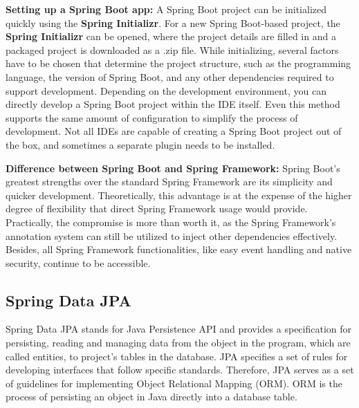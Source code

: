         \blankLine

    \textbf{Setting up a Spring Boot app:} \newline
    A Spring Boot project can be initialized quickly using the \textbf{Spring Initializr}. For a new Spring Boot-based project, the \textbf{Spring Initializr} can be opened, where the project details are filled in and a packaged project is downloaded as a .zip file. While initializing, several factors have to be chosen that determine the project structure, such as the programming language, the version of Spring Boot, and any other dependencies required to support development. \newline
    Depending on the development environment, you can directly develop a Spring Boot project within the IDE itself. Even this method supports the same amount of configuration to simplify the process of development. Not all IDEs are capable of creating a Spring Boot project out of the box, and sometimes a separate plugin needs to be installed.\Autocite{Andi:SpringInit}
    
    \blankLine

    \textbf{Difference between Spring Boot and Spring Framework:} \newline
    Spring Boot's greatest strengths over the standard Spring Framework are its simplicity and quicker development. Theoretically, this advantage is at the expense of the higher degree of flexibility that direct Spring Framework usage would provide. Practically, the compromise is more than  worth it, as the Spring Framework's annotation system can still be utilized to inject other dependencies effectively. Besides, all Spring Framework functionalities, like easy event handling and native security, continue to be accessible. \Autocite{Andi:SpringBoot2}
    
    \subsection{Spring Data JPA}
    Spring Data JPA stands for Java Persistence API and provides a specification for persisting, reading and managing data from the object in the program, which are called entities, to project's tables in the database. JPA specifies a set of rules for developing interfaces that follow specific standards. Therefore, JPA serves as a set of guidelines for implementing Object Relational Mapping (ORM). 
    ORM is the process of persisting an object in Java directly into a database table.

    \blankLine
    
